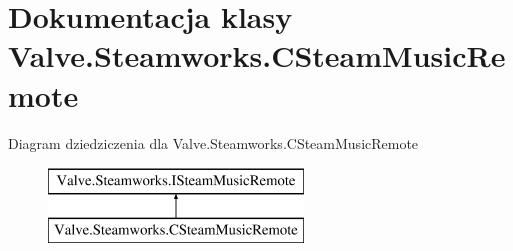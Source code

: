 \hypertarget{class_valve_1_1_steamworks_1_1_c_steam_music_remote}{}\section{Dokumentacja klasy Valve.\+Steamworks.\+C\+Steam\+Music\+Remote}
\label{class_valve_1_1_steamworks_1_1_c_steam_music_remote}
Diagram dziedziczenia dla Valve.\+Steamworks.\+C\+Steam\+Music\+Remote\begin{figure}[H]
\begin{center}
\leavevmode
\includegraphics[height=2.000000cm]{class_valve_1_1_steamworks_1_1_c_steam_music_remote}
\end{center}
\end{figure}
